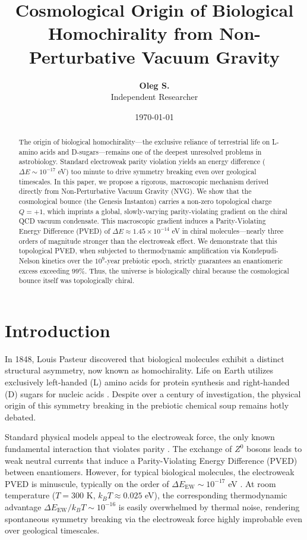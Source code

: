 \documentclass[12pt,a4paper]{article}
\title{\textbf{Cosmological Origin of Biological Homochirality from Non-Perturbative Vacuum Gravity}}
\author{\textbf{Oleg S.} \\ Independent Researcher}
\date{\today}
\begin{document}
\maketitle

\begin{abstract}
The origin of biological homochirality---the exclusive reliance of terrestrial life on L-amino acids and D-sugars---remains one of the deepest unresolved problems in astrobiology. Standard electroweak parity violation yields an energy difference ($\Delta E \sim 10^{-17}$ eV) too minute to drive symmetry breaking even over geological timescales. In this paper, we propose a rigorous, macroscopic mechanism derived directly from Non-Perturbative Vacuum Gravity (NVG). We show that the cosmological bounce (the Genesis Instanton) carries a non-zero topological charge $Q = +1$, which imprints a global, slowly-varying parity-violating gradient on the chiral QCD vacuum condensate. This macroscopic gradient induces a Parity-Violating Energy Difference (PVED) of $\Delta E \approx 1.45 \times 10^{-14}$ eV in chiral molecules---nearly three orders of magnitude stronger than the electroweak effect. We demonstrate that this topological PVED, when subjected to thermodynamic amplification via Kondepudi-Nelson kinetics over the $10^9$-year prebiotic epoch, strictly guarantees an enantiomeric excess exceeding $99\%$. Thus, the universe is biologically chiral because the cosmological bounce itself was topologically chiral.
\end{abstract}

\section{Introduction}

In 1848, Louis Pasteur discovered that biological molecules exhibit a distinct structural asymmetry, now known as homochirality. Life on Earth utilizes exclusively left-handed (L) amino acids for protein synthesis and right-handed (D) sugars for nucleic acids \cite{pasteur1848}. Despite over a century of investigation, the physical origin of this symmetry breaking in the prebiotic chemical soup remains hotly debated.

Standard physical models appeal to the electroweak force, the only known fundamental interaction that violates parity \cite{wu1957}. The exchange of $Z^0$ bosons leads to weak neutral currents that induce a Parity-Violating Energy Difference (PVED) between enantiomers. However, for typical biological molecules, the electroweak PVED is minuscule, typically on the order of $\Delta E_{\text{EW}} \sim 10^{-17}$ eV \cite{kondepudi1985}. At room temperature ($T = 300$ K, $k_B T \approx 0.025$ eV), the corresponding thermodynamic advantage $\Delta E_{\text{EW}} / k_B T \sim 10^{-16}$ is easily overwhelmed by thermal noise, rendering spontaneous symmetry breaking via the electroweak force highly improbable even over geological timescales.
\end{document}
